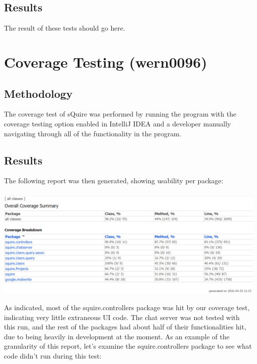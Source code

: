 \documentclass[14pt, a4paper]{article}
\begin{document}
\newpage

\subsection{Results}

The result of these tests should go here.

\newpage

\section{Coverage Testing (wern0096)}

\subsection{Methodology}

The coverage test of sQuire was performed by running the program with the coverage testing option enabled in IntelliJ IDEA and a developer manually navigating through all of the functionality in the program.

\subsection{Results}

The following report was then generated, showing usability per package: \\ \\

\noindent\includegraphics[width=\textwidth]{CoverageTest}

As indicated, most of the squire.controllers package was hit by our coverage test, indicating very little extraneous UI code. The chat server was not tested with this run, and the rest of the packages had about half of their functionalities hit, due to being heavily in development at the moment. As an example of the granularity of this report, let's examine the squire.controllers package to see what code didn't run during this test: \\ \\
\end{document}
